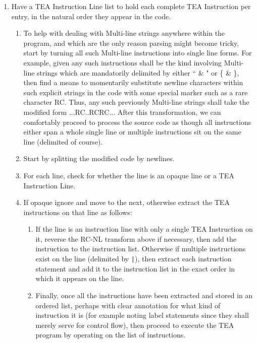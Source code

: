 \documentclass[a4paper, 18pt]{book} %
\begin{document}
\begin{enumerate}
\item{ Have a TEA Instruction Line list to hold each complete TEA Instruction per entry, in the natural order they appear in the code.

\begin{enumerate}
\item{
To help with dealing with Multi-line strings anywhere within the program, and which are the only reason parsing might become tricky, start by turning all such Multi-line instructions into single line forms. For example, given any such instructions shall be the kind involving Multi-line strings which are mandatorily delimited by either `` \& " or \{ \& \}, then find a means to momentarily substitute newline characters within such explicit strings in the code with some special marker such as a rare character RC. Thus, any such previously Multi-line strings shall take the modified form {...RC..RCRC...} After this transformation, we can comfortably proceed to process the source code as though all instructions either span a whole single line or multiple instructions sit on the same line (delimited of course).
}
\item Start by splitting the modified code by newlines.
\item For each line, check for whether the line is an opaque line or a TEA Instruction Line.
\item{ If opaque ignore and move to the next, otherwise extract the TEA instructions on that line as follows:

\begin{enumerate}
\item{
If the line is an instruction line with only a single TEA Instruction on it, reverse the RC-NL transform above if necessary, then add the instruction to the instruction list. Otherwise if multiple instructions exist on the line (delimited by \texttt{|}), then extract each instruction statement and add it to the instruction list in the exact order in which it appears on the line. 
}
\item {
Finally, once all the instructions have been extracted and stored in an ordered list, perhaps with clear annotation for what kind of instruction it is (for example noting label statements since they shall merely serve for control flow), then proceed to execute the TEA program by operating on the list of instructions. 
}
\end{enumerate}
}
\end{enumerate}

}
\end{enumerate}
\end{document}
